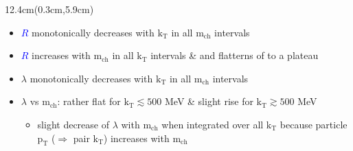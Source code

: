\documentclass[xcolor=dvipsnames]{beamer}
\begin{document}
\begin{frame}
\begin{textblock*}{12.4cm}(0.3cm,5.9cm) %
\small{
\begin{itemize}
 \item \textcolor{blue}{$R$} monotonically decreases with $\mathrm{k}_\mathrm{T}$ in all $\mathrm{m}_\mathrm{ch}$ intervals\\%
 \item \textcolor{blue}{$R$} increases with $\mathrm{m}_\mathrm{ch}$ in all $\mathrm{k}_\mathrm{T}$ intervals \& and flatterns of to a plateau\\%
 \item \textcolor{dgreen}{$\lambda$} monotonically decreases with $\mathrm{k}_\mathrm{T}$ in all $\mathrm{m}_\mathrm{ch}$ intervals\\%
 \item \textcolor{dgreen}{$\lambda$} vs $\mathrm{m}_\mathrm{ch}$: rather flat for $\mathrm{k}_\mathrm{T} \lesssim 500$ MeV \& slight rise for $\mathrm{k}_\mathrm{T} \gtrsim 500$ MeV\\\vspace{-0.05cm}
 \begin{itemize}
  \item slight decrease of \textcolor{dgreen}{$\lambda$} with $\mathrm{m}_\mathrm{ch}$ when integrated over all $\mathrm{k}_\mathrm{T}$ because particle $\mathrm{p}_\mathrm{T}$ ($\Rightarrow$ pair $\mathrm{k}_\mathrm{T}$) increases with $\mathrm{m}_\mathrm{ch}$
 \end{itemize}
\end{itemize}
}
\end{textblock*}

\end{frame}
\end{document}
